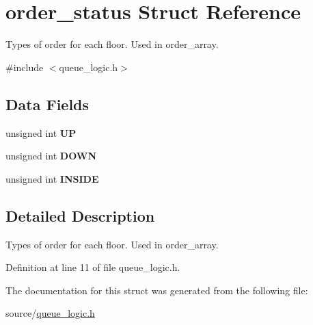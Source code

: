 \hypertarget{structorder__status}{}\section{order\+\_\+status Struct Reference}
\label{structorder__status}


Types of order for each floor. Used in {\ttfamily order\+\_\+array}.  




{\ttfamily \#include $<$queue\+\_\+logic.\+h$>$}

\subsection*{Data Fields}
\begin{DoxyCompactItemize}
\item 
\mbox{\label{structorder__status_ad1dd00a1882ce6a15f53c98ce644fbbd}} 
unsigned int {\bfseries UP}
\item 
\mbox{\label{structorder__status_a3261e9c2acd360b450282cfd3537d971}} 
unsigned int {\bfseries D\+O\+WN}
\item 
\mbox{\label{structorder__status_a6398d7afe55a7b80f58716325d2725ee}} 
unsigned int {\bfseries I\+N\+S\+I\+DE}
\end{DoxyCompactItemize}


\subsection{Detailed Description}
Types of order for each floor. Used in {\ttfamily order\+\_\+array}. 

Definition at line 11 of file queue\+\_\+logic.\+h.



The documentation for this struct was generated from the following file\+:\begin{DoxyCompactItemize}
\item 
source/\hyperlink{queue__logic_8h}{queue\+\_\+logic.\+h}\end{DoxyCompactItemize}
